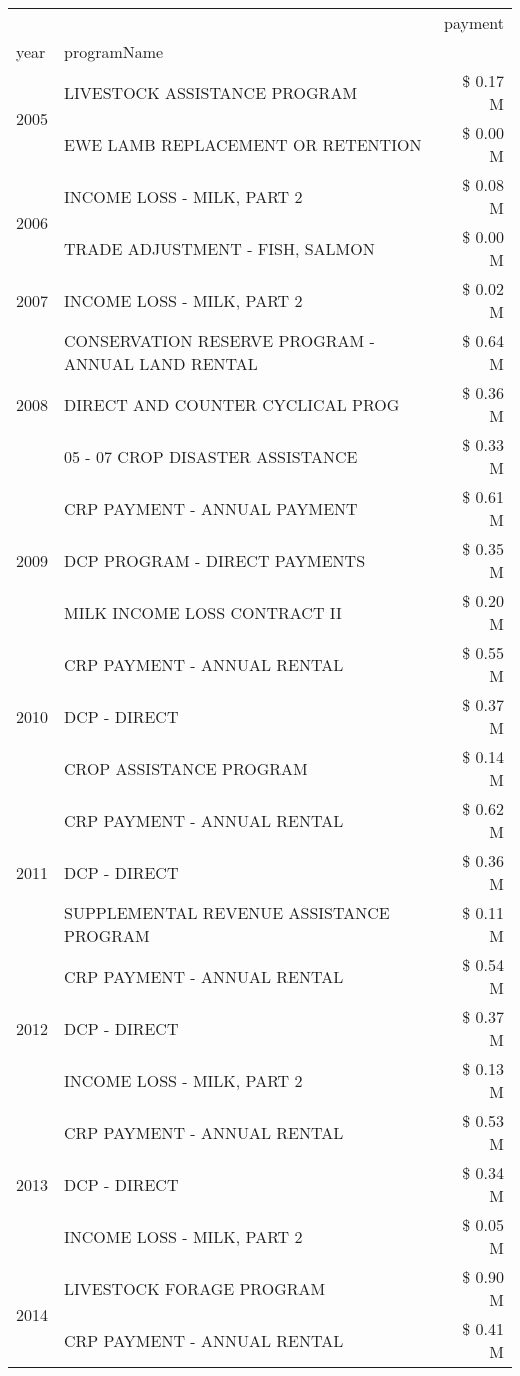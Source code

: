 \begin{tabular}{llr}
\toprule
 &  & payment \\
year & programName &  \\
\midrule
\multirow[t]{2}{*}{2005} & LIVESTOCK ASSISTANCE PROGRAM & \$ 0.17 M \\
 & EWE LAMB REPLACEMENT OR RETENTION & \$ 0.00 M \\
\cline{1-3}
\multirow[t]{2}{*}{2006} & INCOME LOSS - MILK, PART 2 & \$ 0.08 M \\
 & TRADE ADJUSTMENT - FISH, SALMON & \$ 0.00 M \\
\cline{1-3}
2007 & INCOME LOSS - MILK, PART 2 & \$ 0.02 M \\
\cline{1-3}
\multirow[t]{3}{*}{2008} & CONSERVATION RESERVE PROGRAM - ANNUAL LAND RENTAL & \$ 0.64 M \\
 & DIRECT AND COUNTER CYCLICAL PROG & \$ 0.36 M \\
 & 05 - 07 CROP DISASTER ASSISTANCE & \$ 0.33 M \\
\cline{1-3}
\multirow[t]{3}{*}{2009} & CRP PAYMENT - ANNUAL PAYMENT & \$ 0.61 M \\
 & DCP PROGRAM - DIRECT PAYMENTS & \$ 0.35 M \\
 & MILK INCOME LOSS CONTRACT II & \$ 0.20 M \\
\cline{1-3}
\multirow[t]{3}{*}{2010} & CRP PAYMENT - ANNUAL RENTAL & \$ 0.55 M \\
 & DCP - DIRECT & \$ 0.37 M \\
 & CROP ASSISTANCE PROGRAM & \$ 0.14 M \\
\cline{1-3}
\multirow[t]{3}{*}{2011} & CRP PAYMENT - ANNUAL RENTAL & \$ 0.62 M \\
 & DCP - DIRECT & \$ 0.36 M \\
 & SUPPLEMENTAL REVENUE ASSISTANCE PROGRAM & \$ 0.11 M \\
\cline{1-3}
\multirow[t]{3}{*}{2012} & CRP PAYMENT - ANNUAL RENTAL & \$ 0.54 M \\
 & DCP - DIRECT & \$ 0.37 M \\
 & INCOME LOSS - MILK, PART 2 & \$ 0.13 M \\
\cline{1-3}
\multirow[t]{3}{*}{2013} & CRP PAYMENT - ANNUAL RENTAL & \$ 0.53 M \\
 & DCP - DIRECT & \$ 0.34 M \\
 & INCOME LOSS - MILK, PART 2 & \$ 0.05 M \\
\cline{1-3}
\multirow[t]{3}{*}{2014} & LIVESTOCK FORAGE PROGRAM & \$ 0.90 M \\
 & CRP PAYMENT - ANNUAL RENTAL & \$ 0.41 M \\

\end{tabular}
